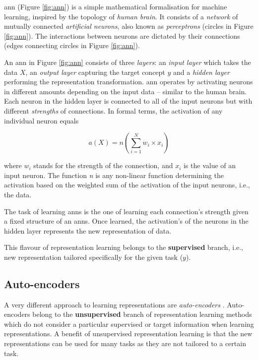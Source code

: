 \gls{ann} (Figure \ref{fig:ann}) is a simple mathematical formalisation for machine learning, inspired by the topology of  \textit{human brain}.
It consists of a \textit{network} of mutually connected \textit{artificial neurons}, also known as \textit{perceptrons} (circles in Figure \ref{fig:ann}).
The interactions between neurons are dictated by their connections (edges connecting circles in Figure \ref{fig:ann}).




An \gls{ann} in Figure \ref{fig:ann} consists of three \textit{layers}: an \textit{input layer} which takes the data $X$, an \textit{output layer} capturing the target concept $y$ and a \textit{hidden layer} performing the representation transformation.
\gls{ann} operates by activating neurons in different amounts depending on the input data -- similar to the human brain.
Each neuron in the hidden layer is connected to all of the input neurons but with different \textit{strengths} of connections.
In formal terms, the  activation of any individual neuron equals

\begin{equation}
	a(X) = n(\sum_{i=1}^N w_i \times x_i)
\end{equation}

where $w_i$ stands for the strength of the connection, and $x_i$ is the value of an input neuron.
The function \textit{n} is any non-linear function determining the activation based on the weighted sum of the activation of the input neurons, i.e., the data.




The task of learning \gls{ann}s is the one of learning each connection's strength given a fixed structure of an \gls{ann}s.
Once learned, the activation's of the neurons in the hidden layer represents the new representation of data.


This flavour of representation learning belongs to the \textbf{supervised} branch, i.e.,  new representation tailored specifically for the given task ($y$).




\subsection{Auto-encoders}


A very different approach to learning representations are \textit{auto-encoders} \cite{Hinton504}.
Auto-encoders belong to the \textbf{unsupervised} branch of representation learning methods which do not consider a particular supervised or target information when learning representations.
A benefit of unsupervised representation learning is that the new representations can be used for many tasks as they are not tailored to a certain task.


